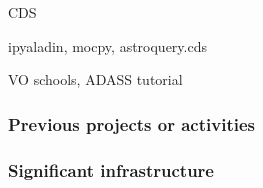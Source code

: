 \begin{sitedescription}{CDS}
\begin{compactenum}

  \item ipyaladin, mocpy, astroquery.cds

  \item VO schools, ADASS tutorial

\item {}
\end{compactenum}

\subsubsection*{Previous projects or activities}

\begin{compactenum}
  
\item {}
\end{compactenum}

\subsubsection*{Significant infrastructure}

\end{sitedescription}
